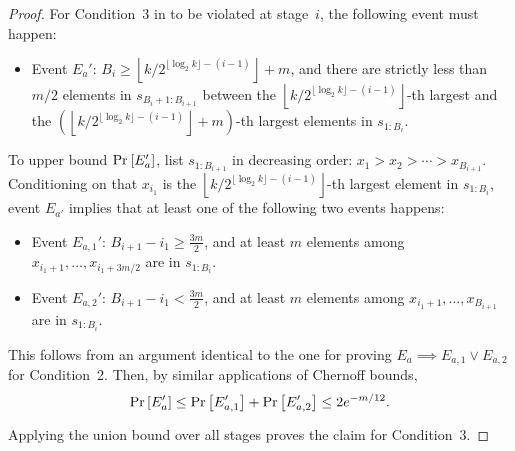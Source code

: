 \begin{proof}
For Condition~3 in  to be violated at stage~$i$, the following event must happen:
\begin{itemize}
    \item Event $E_a'$: $B_i\ge \left\lfloor k/2^{\lfloor\log_2 k\rfloor - (i-1)}\right\rfloor + m$, and there are strictly less than $m/2$ elements in $s_{B_i + 1: B_{i+1}}$ between the $\left\lfloor k/2^{\lfloor\log_2 k\rfloor - (i-1)}\right\rfloor $-th largest  and the $\left(\left\lfloor k/2^{\lfloor\log_2 k\rfloor - (i-1)}\right\rfloor + m\right) $-th largest elements in $s_{1:B_i}$.
\end{itemize}
To upper bound $\Pr_{}\left[E'_a\right]$, list $s_{1:B_{i+1}}$ in decreasing order:  $x_1> x_2 > \cdots> x_{B_{i+1}}$. Conditioning on that $x_{i_1}$ is the $\left\lfloor k/2^{\lfloor\log_2 k\rfloor - (i-1)}\right\rfloor $-th largest element in $s_{1:B_i}$, event $E_{a'}$ implies that at least one of the following two events happens:
\begin{itemize}
    \item Event $E_{a,1}'$: $B_{i+1} - i_1 \ge \frac{3m}{2}$, and at least $m$ elements among $ x_{i_1 + 1}, \ldots, x_{i_1 + 3m/2}$ are in $s_{1:B_i}$.
    \item Event $E_{a,2}'$: $B_{i+1} - i_1 < \frac{3m}{2}$, and at least $m$ elements among $ x_{i_1 + 1}, \ldots, x_{B_{i+1}}$ are in $s_{1:B_i}$.
\end{itemize}
This follows from an argument identical to the one for proving $E_a \implies E_{a,1} \vee E_{a,2}$ for Condition~2. Then, by similar applications of Chernoff bounds,
\[
    \Pr_{}\left[E'_a\right] \le \Pr_{}\left[E'_{a,1}\right] + \Pr_{}\left[E'_{a,2}\right] \le 2e^{-m/12}.
\]
Applying the union bound over all stages proves the claim for Condition~3.
\end{proof}

